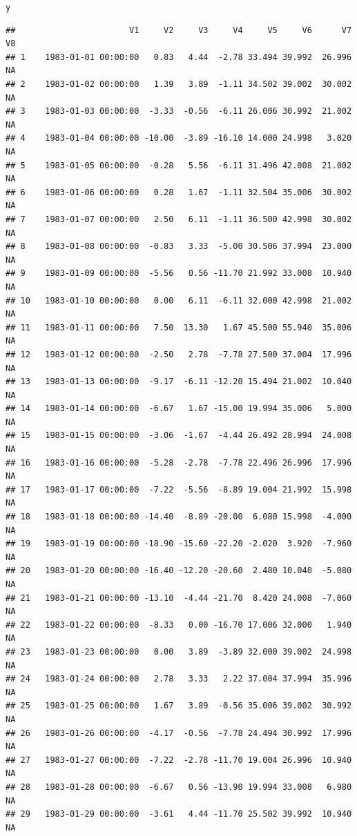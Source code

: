 \documentclass{article}\usepackage{graphicx, color}
\makeatletter
\newenvironment{kframe}{%
 \def\at@end@of@kframe{}%
 \ifinner\ifhmode%
  \def\at@end@of@kframe{\end{minipage}}%
  \begin{minipage}{\columnwidth}%
 \fi\fi%
 \def\FrameCommand##1{\hskip\@totalleftmargin \hskip-\fboxsep
 \colorbox{shadecolor}{##1}\hskip-\fboxsep
     \hskip-\linewidth \hskip-\@totalleftmargin \hskip\columnwidth}%
 \MakeFramed {\advance\hsize-\width
   \@totalleftmargin\z@ \linewidth\hsize
   \@setminipage}}%
 {\par\unskip\endMakeFramed%
 \at@end@of@kframe}
\newenvironment{knitrout}{}{} %
\makeatother
\begin{document}
\begin{knitrout}
\begin{kframe}
{\ttfamily\noindent\bfseries\color{errorcolor}{\#\# Error: cannot coerce type 'environment' to vector of type 'any'}}\begin{alltt}
y
\end{alltt}
\begin{verbatim}
##                       V1     V2     V3     V4     V5     V6      V7     V8
## 1    1983-01-01 00:00:00   0.83   4.44  -2.78 33.494 39.992  26.996     NA
## 2    1983-01-02 00:00:00   1.39   3.89  -1.11 34.502 39.002  30.002     NA
## 3    1983-01-03 00:00:00  -3.33  -0.56  -6.11 26.006 30.992  21.002     NA
## 4    1983-01-04 00:00:00 -10.00  -3.89 -16.10 14.000 24.998   3.020     NA
## 5    1983-01-05 00:00:00  -0.28   5.56  -6.11 31.496 42.008  21.002     NA
## 6    1983-01-06 00:00:00   0.28   1.67  -1.11 32.504 35.006  30.002     NA
## 7    1983-01-07 00:00:00   2.50   6.11  -1.11 36.500 42.998  30.002     NA
## 8    1983-01-08 00:00:00  -0.83   3.33  -5.00 30.506 37.994  23.000     NA
## 9    1983-01-09 00:00:00  -5.56   0.56 -11.70 21.992 33.008  10.940     NA
## 10   1983-01-10 00:00:00   0.00   6.11  -6.11 32.000 42.998  21.002     NA
## 11   1983-01-11 00:00:00   7.50  13.30   1.67 45.500 55.940  35.006     NA
## 12   1983-01-12 00:00:00  -2.50   2.78  -7.78 27.500 37.004  17.996     NA
## 13   1983-01-13 00:00:00  -9.17  -6.11 -12.20 15.494 21.002  10.040     NA
## 14   1983-01-14 00:00:00  -6.67   1.67 -15.00 19.994 35.006   5.000     NA
## 15   1983-01-15 00:00:00  -3.06  -1.67  -4.44 26.492 28.994  24.008     NA
## 16   1983-01-16 00:00:00  -5.28  -2.78  -7.78 22.496 26.996  17.996     NA
## 17   1983-01-17 00:00:00  -7.22  -5.56  -8.89 19.004 21.992  15.998     NA
## 18   1983-01-18 00:00:00 -14.40  -8.89 -20.00  6.080 15.998  -4.000     NA
## 19   1983-01-19 00:00:00 -18.90 -15.60 -22.20 -2.020  3.920  -7.960     NA
## 20   1983-01-20 00:00:00 -16.40 -12.20 -20.60  2.480 10.040  -5.080     NA
## 21   1983-01-21 00:00:00 -13.10  -4.44 -21.70  8.420 24.008  -7.060     NA
## 22   1983-01-22 00:00:00  -8.33   0.00 -16.70 17.006 32.000   1.940     NA
## 23   1983-01-23 00:00:00   0.00   3.89  -3.89 32.000 39.002  24.998     NA
## 24   1983-01-24 00:00:00   2.78   3.33   2.22 37.004 37.994  35.996     NA
## 25   1983-01-25 00:00:00   1.67   3.89  -0.56 35.006 39.002  30.992     NA
## 26   1983-01-26 00:00:00  -4.17  -0.56  -7.78 24.494 30.992  17.996     NA
## 27   1983-01-27 00:00:00  -7.22  -2.78 -11.70 19.004 26.996  10.940     NA
## 28   1983-01-28 00:00:00  -6.67   0.56 -13.90 19.994 33.008   6.980     NA
## 29   1983-01-29 00:00:00  -3.61   4.44 -11.70 25.502 39.992  10.940     NA

\end{verbatim}
\end{kframe}
\end{knitrout}
\end{document}
